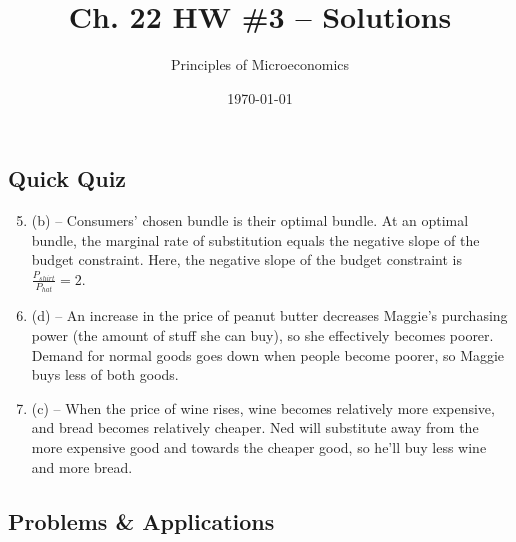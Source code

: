 \documentclass{article}
\title{Ch. 22 HW \#3 -- Solutions}
\author{Principles of Microeconomics}
\date{\today}
\begin{document}
\maketitle

\subsection*{Quick Quiz}

\begin{enumerate}
\setcounter{enumi}{4}

\item (b) -- Consumers' chosen bundle is their optimal bundle. At an optimal bundle, the marginal rate of substitution equals the negative slope of the budget constraint. Here, the negative slope of the budget constraint is \\ $\frac{P_{shirt}}{P_{hat}} = 2$.

\item (d) -- An increase in the price of peanut butter decreases Maggie's purchasing power (the amount of stuff she can buy), so she effectively becomes poorer. Demand for normal goods goes down when people become poorer, so Maggie buys less of both goods.

\item (c) -- When the price of wine rises, wine becomes relatively more expensive, and bread becomes relatively cheaper. Ned will substitute away from the more expensive good and towards the cheaper good, so he'll buy less wine and more bread.

\end{enumerate}

\subsection*{Problems \& Applications}
\end{document}
